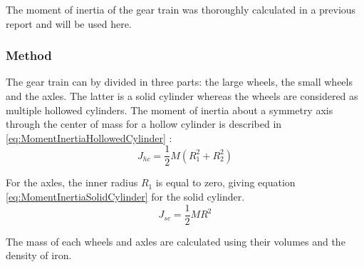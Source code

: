 
The moment of inertia of the gear train was thoroughly calculated in a previous report and will be used here.

\subsubsection*{Method}
The gear train can by divided in three parts: the large wheels, the small wheels and the axles. The latter is a solid cylinder whereas the wheels are considered as multiple hollowed cylinders. The moment of inertia about a symmetry axis through the center of mass for a hollow cylinder is described in \autoref{eq:MomentInertiaHollowedCylinder} \citep{web:MomentOfInertiaHollowCylinder}: 
\begin{equation}
	J_{hc} = \frac{1}{2} M (R_1^2 + R_2^2)
	\label{eq:MomentInertiaHollowedCylinder}
\end{equation}
\startexplain
{}
\stopexplain

For the axles, the inner radius $R_1$ is equal to zero, giving equation \autoref{eq:MomentInertiaSolidCylinder} for the solid cylinder.
\begin{equation}
	J_{sc} = \frac{1}{2} M R^2
	\label{eq:MomentInertiaSolidCylinder}
\end{equation}
\startexplain
{}
\stopexplain

The mass of each wheels and axles are calculated using their volumes and the density of iron.

